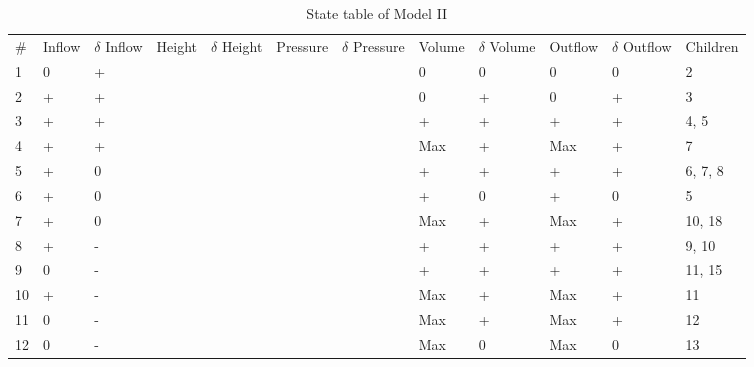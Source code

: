 \documentclass{article}
\begin{document}
\begin{table}[]
	\centering
	\caption{State table of Model II}
	\label{table2}
	\begin{tabular}{llllllllllll}
		\# & Inflow & $\delta$ Inflow & Height & $\delta$ Height & Pressure & $\delta$ Pressure & Volume & $\delta$ Volume & Outflow & $\delta$ Outflow & Children \\
		1  & 0      & +               &        &                 &          &                   & 0      & 0               & 0       & 0                & 2        \\
		2  & +      & +               &        &                 &          &                   & 0      & +               & 0       & +                & 3        \\
		3  & +      & +               &        &                 &          &                   & +      & +               & +       & +                & 4, 5     \\
		4  & +      & +               &        &                 &          &                   & Max    & +               & Max     & +                & 7        \\
		5  & +      & 0               &        &                 &          &                   & +      & +               & +       & +                & 6, 7, 8  \\
		6  & +      & 0               &        &                 &          &                   & +      & 0               & +       & 0                & 5        \\
		7  & +      & 0               &        &                 &          &                   & Max    & +               & Max     & +                & 10, 18   \\
		8  & +      & -               &        &                 &          &                   & +      & +               & +       & +                & 9, 10    \\
		9  & 0      & -               &        &                 &          &                   & +      & +               & +       & +                & 11, 15   \\
		10 & +      & -               &        &                 &          &                   & Max    & +               & Max     & +                & 11       \\
		11 & 0      & -               &        &                 &          &                   & Max    & +               & Max     & +                & 12       \\
		12 & 0      & -               &        &                 &          &                   & Max    & 0               & Max     & 0                & 13       \\

\end{tabular}
\end{table}
\end{document}
